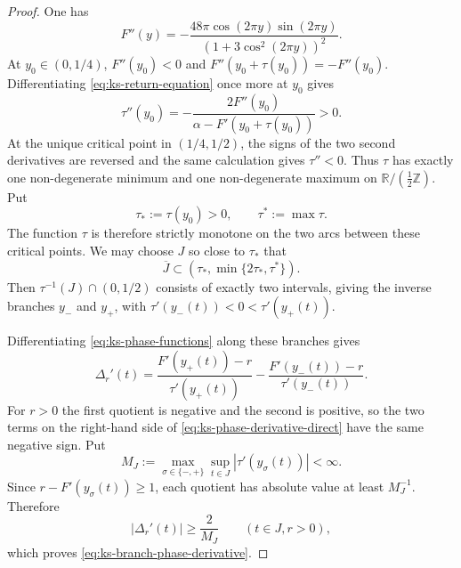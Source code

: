 \documentclass[11pt,reqno,a4paper]{amsart}
\numberwithin{equation}{section}
\theoremstyle{compact}
\theoremstyle{definition}
\theoremstyle{definition}
\begin{document}
\begin{proof}
One has
\begin{equation}\label{eq:ks-second-derivative-F}
  F''(y)
  =-\frac{48\pi\cos(2\pi y)\sin(2\pi y)}
          {(1+3\cos^2(2\pi y))^2}.
\end{equation}
At $y_0\in(0,1/4)$, $F''(y_0)<0$ and
$F''(y_0+\tau(y_0))=-F''(y_0)$.  Differentiating
\eqref{eq:ks-return-equation} once more at $y_0$ gives
\begin{equation}\label{eq:ks-return-second-derivative}
  \tau''(y_0)
  =-\frac{2F''(y_0)}{\alpha-F'(y_0+\tau(y_0))}>0.
\end{equation}
At the unique critical point in $(1/4,1/2)$, the signs of the two second
derivatives are reversed and the same calculation gives $\tau''<0$.  Thus
$\tau$ has exactly one non-degenerate minimum and one non-degenerate maximum
on $\mathbb R/(\frac12\mathbb Z)$.  Put
\[
  \tau_*:=\tau(y_0)>0,
  \qquad
  \tau^*:=\max\tau.
\]
The function $\tau$ is therefore strictly monotone on the two arcs between
these critical points.  We may choose $J$ so close to $\tau_*$ that
\[
  \overline J\subset(\tau_*,\min\{2\tau_*,\tau^*\}).
\]
Then $\tau^{-1}(J)\cap(0,1/2)$ consists of exactly two intervals, giving the
inverse branches $y_-$ and $y_+$, with
$\tau'(y_-(t))<0<\tau'(y_+(t))$.

Differentiating \eqref{eq:ks-phase-functions} along these branches gives
\begin{equation}\label{eq:ks-phase-derivative-direct}
  \Delta_r'(t)
  =\frac{F'(y_+(t))-r}{\tau'(y_+(t))}
   -\frac{F'(y_-(t))-r}{\tau'(y_-(t))}.
\end{equation}
For $r>0$ the first quotient is negative and the second is positive, so the
two terms on the right-hand side of
\eqref{eq:ks-phase-derivative-direct} have the same negative sign.  Put
\[
  M_J:=\max_{\sigma\in\{-,+\}}
       \sup_{t\in J}|\tau'(y_\sigma(t))|<\infty.
\]
Since $r-F'(y_\sigma(t))\geq1$, each quotient has absolute value at least
$M_J^{-1}$.  Therefore
\[
  |\Delta_r'(t)|\geq \frac2{M_J}
  \qquad(t\in J,r>0),
\]
which proves \eqref{eq:ks-branch-phase-derivative}.
\end{proof}
\end{document}

